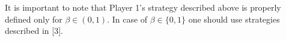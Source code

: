 It is important to note that Player 1's strategy described above is properly
defined only for $\beta \in (0, 1)$. In case of $\beta \in \{0, 1\}$ one should
use strategies described in [3].



